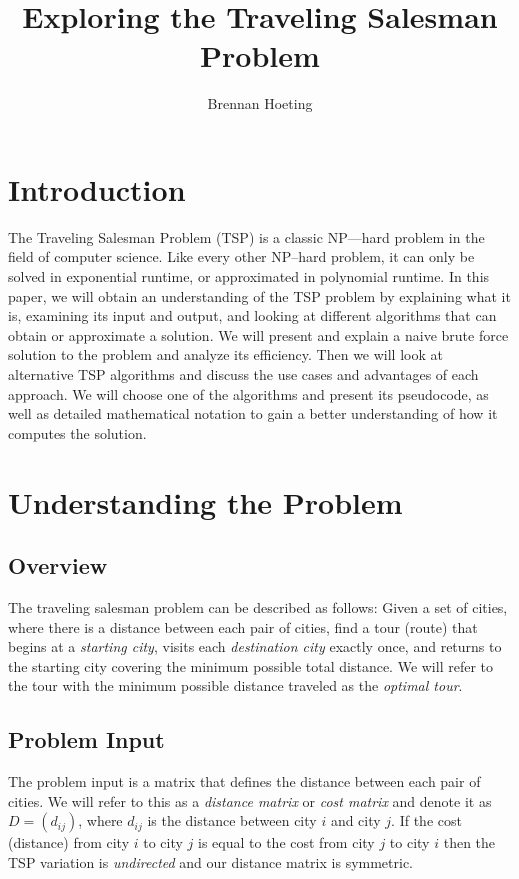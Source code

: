 \documentclass[11pt,fleqn]{article}
\begin{document}
\title{Exploring the Traveling Salesman Problem}
\author{Brennan Hoeting}
\date{}
\maketitle

\section*{Introduction}
The Traveling Salesman Problem (TSP) is a classic NP---hard problem
in the field of computer science.  Like every other NP--hard problem,
it can only be solved in exponential runtime, or approximated in polynomial
runtime.  In this paper, we will obtain an understanding of the TSP problem
by explaining what it is, examining its input and output, and looking at
different algorithms that can obtain or approximate a solution.  We will
present and explain a naive brute force solution to the problem and analyze
its efficiency.  Then we will look at alternative TSP algorithms and discuss
the use cases and advantages of each approach.  We will choose one of the
algorithms and present its pseudocode, as well as detailed mathematical
notation to gain a better understanding of how it computes the solution.

\section{Understanding the Problem}
\subsection{Overview}
The traveling salesman problem can be described as follows:
Given a set of cities, where there is a distance between
each pair of cities, find a tour (route) that begins at a
\textit{starting city}, visits each \textit{destination city}
exactly once, and returns to the starting city covering the minimum
possible total distance.  We will refer to the tour with the
minimum possible distance traveled as the \textit{optimal tour}.

\subsection{Problem Input}
The problem input is a matrix that defines the distance
between each pair of cities.  We will refer to this as
a \textit{distance matrix} or \textit{cost matrix} and denote
it as $D = (d_{ij})$, where $d_{ij}$ is the distance between city
$i$ and city $j$.  If the cost (distance) from city $i$ to city $j$
is equal to the cost from city $j$ to city $i$ then the TSP variation
is \textit{undirected} and our distance matrix is symmetric.
\par
\end{document}
